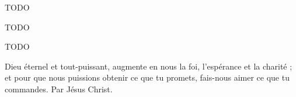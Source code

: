 \documentclass[RG2023_CarnetCommun.tex]{subfiles}
\begin{document}


TODO


TODO


TODO

Dieu éternel et tout-puissant,
augmente en nous la foi,
l’espérance et la charité ; et pour
que nous puissions obtenir ce
que tu promets, fais-nous aimer
ce que tu commandes. Par Jésus
Christ.
\end{document}
